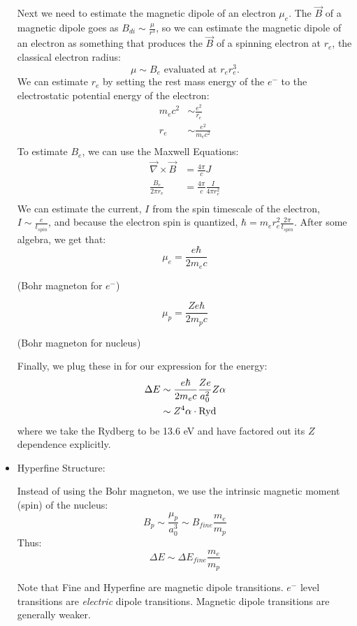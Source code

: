 \documentclass{article}
\begin{document}
\begin{itemize}
Next we need to estimate the magnetic dipole of an electron $\mu_e$. The $\vec{B}$ of a magnetic dipole goes as $B_{di}\sim\frac{\mu}{r^3}$,
so we can estimate the magnetic dipole of an electron as something that produces the $\vec{B}$ of a spinning electron at $r_e$, the classical
electron radius:
\begin{equation}
\mu\sim B_e \text{ evaluated at }{r_e}r_e^3.
\end{equation}
We can estimate $r_e$ by setting the rest mass energy of the $e^-$ to the 
electrostatic potential energy of the electron:
\begin{align}
m_ec^2&\sim\frac{e^2}{r_e}\\
r_e&\sim\frac{e^2}{m_ec^2}\\
\end{align}
To estimate $B_e$, we can use the Maxwell Equations:
\begin{align}
\vec{\nabla} \times \vec{B} &=\frac{4\pi}{c} J\\
\frac{B_e}{2\pi r_e}&=\frac{4\pi}{c}\frac{I}{4\pi r_e^2}\\
\end{align}
We can estimate the current, $I$ from the spin timescale of the electron, $I\sim\frac{e}{t_{spin}}$, and because the electron
spin is quantized, $\hbar=m_er_e^2\frac{2\pi}{t_{spin}}$.
After some algebra, we get that:
\begin{equation}
\mu_e=\frac{e\hbar}{2m_ec}
\end{equation}
\centerline{(Bohr magneton for $e^-$)}
\begin{equation}
\mu_p=\frac{Ze\hbar}{2m_pc}
\end{equation}
\centerline{(Bohr magneton for nucleus)}
Finally, we plug these in for our expression for the energy:
\begin{align}
\Delta E&\sim\frac{e\hbar}{2m_ec}\frac{Ze}{ a_0^2}Z\alpha\\ 
&\sim Z^4\alpha\cdot {\rm Ryd}\\
\end{align}
where we take the Rydberg to be 13.6 eV and have factored out its $Z$ dependence explicitly.

\item Hyperfine Structure:\par
Instead of using the Bohr magneton, we use the intrinsic magnetic moment
(spin) of the nucleus:
$$B_p \sim\frac{\mu_p}{a_0^3}\sim B_{fine}\frac{m_e}{m_p}$$
Thus:
$$\Delta E\sim\Delta E_{fine}\frac{m_e}{m_p}$$

Note that Fine and Hyperfine are magnetic dipole transitions.  $e^-$ level
transitions are {\it electric} dipole transitions.  Magnetic dipole transitions
are generally weaker.


\end{itemize}
\end{document}
